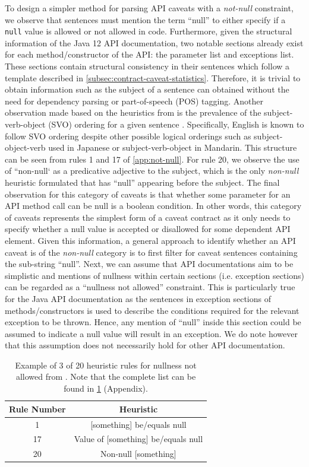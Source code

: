 To design a simpler method for parsing API caveats with a \textit{not-null} constraint, we observe that sentences must mention the term ``null'' to either specify if a \lstinline{null} value is allowed or not allowed in code. Furthermore, given the structural information of the Java 12 API documentation, two notable sections already exist for each method/constructor of the API: the parameter list and exceptions list. These sections contain structural consistency in their sentences which follow a template described in \ref{subsec:contract-caveat-statistics}. Therefore, it is trivial to obtain information such as the subject of a sentence can obtained without the need for dependency parsing or part-of-speech (POS) tagging. Another observation made based on the heuristics from \cite{zhou-directive} is the prevalence of the subject-verb-object (SVO) ordering for a given sentence \cite{dryer200581}. Specifically, English is known to follow SVO ordering despite other possible logical orderings such as subject-object-verb used in Japanese or subject-verb-object in Mandarin. This structure can be seen from rules 1 and 17 of \ref{app:not-null}. For rule 20, we observe the use of ``non-null` as a predicative adjective to the subject, which is the only \textit{non-null} heuristic formulated that has ``null'' appearing before the subject. The final observation for this category of caveats is that whether some parameter for an API method call can be null is a boolean condition. In other words, this category of caveats represents the simplest form of a caveat contract as it only needs to specify whether a null value is accepted or disallowed for some dependent API element. Given this information, a general approach to identify whether an API caveat is of the \textit{non-null} category is to first filter for caveat sentences containing the sub-string ``null''. Next, we can assume that API documentations aim to be simplistic and mentions of nullness within certain sections (i.e. exception sections) can be regarded as a ``nullness not allowed'' constraint. This is particularly true for the Java API documentation as the sentences in exception sections of methods/constructors is used to describe the conditions required for the relevant exception to be thrown. Hence, any mention of ``null'' inside this section could be assumed to indicate a null value will result in an exception. We do note however that this assumption does not necessarily hold for other API documentation. \\

\begin{table}[]
	\begin{tabular}{|cc|}
		\hline
		Rule Number & Heuristic \\ \hline
		1 & [something] be/equals null \\
		17 & Value of [something] be/equals null \\
		20 & Non-null [something] \\ \hline
	\end{tabular}
	\caption{Example of 3 of 20 heuristic rules for nullness not allowed from \cite{zhou-directive}. Note that the complete list can be found in \ref{tab:not-null-heuristic} (Appendix).}
	\label{tab:not-null-heuristic}
\end{table}

